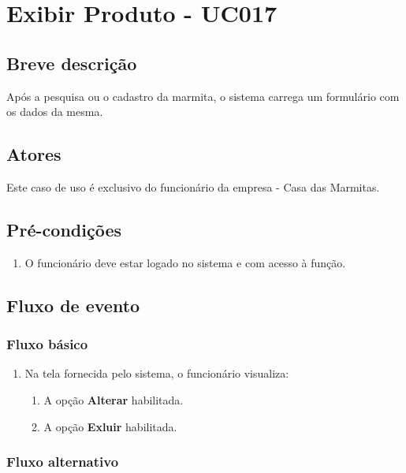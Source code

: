 \chapter{Exibir Produto - UC017} \label{uc017}

\section{Breve descrição}

Após a pesquisa ou o cadastro da marmita, o sistema carrega um formulário com os dados da mesma.

\section{Atores}

Este caso de uso é exclusivo do funcionário da empresa - Casa das Marmitas.

\section{Pré-condições}

\begin{enumerate}
	\item O funcionário deve estar logado no sistema e com acesso à função.
\end{enumerate}

\section{Fluxo de evento}

\subsection{Fluxo básico}

\begin{enumerate}
	\item Na tela fornecida pelo sistema, o funcionário visualiza:
	\begin{enumerate}
		\item A opção \textbf{Alterar} habilitada.
		\item A opção \textbf{Exluir} habilitada.
	\end{enumerate}		
\end{enumerate}

\subsection{Fluxo alternativo}

